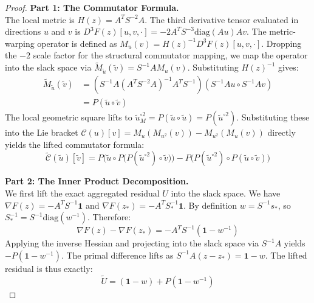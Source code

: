 \documentclass[11pt]{article}
\begin{document}
\begin{proof}
\textbf{Part 1: The Commutator Formula.} \\
The local metric is $H(z) = A^T S^{-2} A$. The third derivative tensor evaluated in directions $u$ and $v$ is $D^3F(z)[u, v, \cdot] = -2 A^T S^{-3} \mathrm{diag}(Au) Av$.
The metric-warping operator is defined as $M_u(v) = H(z)^{-1} D^3F(z)[u, v, \cdot]$. Dropping the $-2$ scale factor for the structural commutator mapping, we map the operator into the slack space via $\widetilde{M}_{\tilde{u}}(\tilde{v}) = S^{-1} A M_u(v)$. Substituting $H(z)^{-1}$ gives:
\begin{align*}
    \widetilde{M}_{\tilde{u}}(\tilde{v}) &= \left( S^{-1} A (A^T S^{-2} A)^{-1} A^T S^{-1} \right) (S^{-1} A u \circ S^{-1} A v) \\
    &= P(\tilde{u} \circ \tilde{v})
\end{align*}
The local geometric square lifts to $\tilde{u}^{\circ 2}_M = P(\tilde{u} \circ \tilde{u}) = P(\tilde{u}^{\circ 2})$. Substituting these into the Lie bracket $\mathcal{C}(u)[v] = M_u(M_{u^2}(v)) - M_{u^2}(M_u(v))$ directly yields the lifted commutator formula:
\begin{equation*}
    \widetilde{\mathcal{C}}(\tilde{u})[\tilde{v}] = P \Big( \tilde{u} \circ P \big( P(\tilde{u}^{\circ 2}) \circ \tilde{v} \big) \Big) - P \Big( P(\tilde{u}^{\circ 2}) \circ P(\tilde{u} \circ \tilde{v}) \Big)
\end{equation*}

\textbf{Part 2: The Inner Product Decomposition.} \\
We first lift the exact aggregated residual $U$ into the slack space. We have $\nabla F(z) = -A^T S^{-1}\mathbf{1}$ and $\nabla F(z_*) = -A^T S_*^{-1}\mathbf{1}$. By definition $w = S^{-1}s_*$, so $S_*^{-1} = S^{-1} \mathrm{diag}(w^{-1})$. Therefore:
\begin{equation*}
    \nabla F(z) - \nabla F(z_*) = -A^T S^{-1} (\mathbf{1} - w^{-1})
\end{equation*}
Applying the inverse Hessian and projecting into the slack space via $S^{-1}A$ yields $-P(\mathbf{1} - w^{-1})$. The primal difference lifts as $S^{-1}A(z - z_*) = \mathbf{1} - w$. The lifted residual is thus exactly:
\begin{equation*}
    \tilde{U} = (\mathbf{1} - w) + P(\mathbf{1} - w^{-1})
\end{equation*}


\end{proof}
\end{document}
